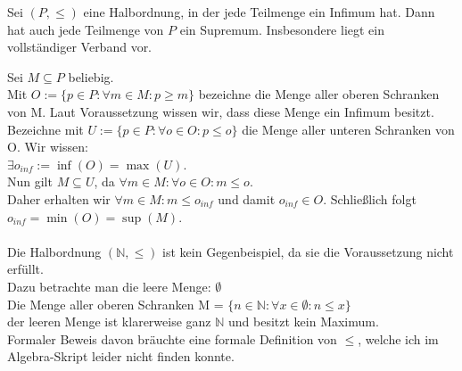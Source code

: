 \begin{exercise}
    Sei $(P,\leq)$ eine Halbordnung, in der jede Teilmenge ein Infimum hat.
    Dann hat auch jede Teilmenge von $P$ ein Supremum. Insbesondere liegt ein
    vollständiger Verband vor.
\end{exercise}
\begin{solution}
Sei $M \subseteq P$ beliebig. \\
Mit $O := \{p \in P: \forall m \in M: p \geq m\}$
bezeichne die Menge aller oberen Schranken von M. Laut Voraussetzung wissen wir,
dass diese Menge ein Infimum besitzt. \\
Bezeichne mit $U := \{p \in P: \forall o \in O: p \leq o\}$ die Menge aller
unteren Schranken von O. Wir wissen: \\
$\exists o_{inf} := \inf(O) = \max(U)$. \\
Nun gilt $M \subseteq U$, da
$\forall m \in M: \forall o \in O: m \leq o$. \\
Daher erhalten wir $\forall m \in M: m \leq o_{inf}$ und damit $o_{inf} \in O$.
Schließlich folgt $o_{inf} = \min(O) = \sup(M)$. \\
\\
Die Halbordnung $(\mathbb{N}, \leq)$ ist kein Gegenbeispiel, da sie die Voraussetzung
nicht erfüllt. \\
Dazu betrachte man die leere Menge: $\emptyset$\\
Die Menge aller oberen Schranken M = $\{n \in \mathbb{N}: \forall x \in \emptyset: n \leq x \}$\\
der leeren Menge ist klarerweise ganz $\mathbb{N}$ und besitzt kein Maximum. \\
Formaler Beweis davon bräuchte eine formale Definition von $\leq$, welche ich
im Algebra-Skript leider nicht finden konnte.
\end{solution}
